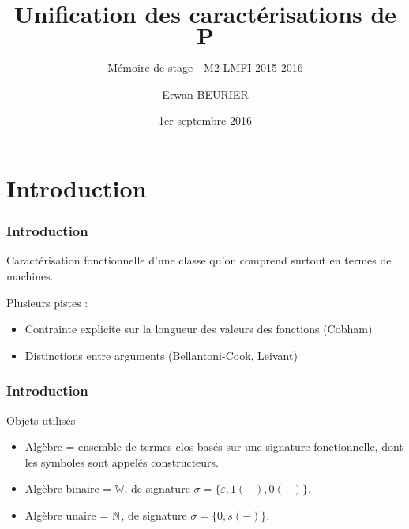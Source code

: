 \documentclass[10pt]{beamer}
\author{Erwan BEURIER}
\title{Unification des caractérisations de $\textbf{P}$}
\subtitle{Mémoire de stage - M2 LMFI 2015-2016}
\date{1er septembre 2016}
\newcommand{\bbW}{\mathbb{W}}
\begin{document}
    \begin{frame}
		\titlepage
    \end{frame}

	\section{Introduction}

	\begin{frame}
	\frametitle{Introduction}
		\begin{block}
			
			Caractérisation fonctionnelle d'une classe qu'on comprend surtout en termes de machines.
			
			\pause 

			Plusieurs pistes : 
			\begin{itemize}
				\item 	Contrainte explicite sur la longueur des valeurs des fonctions (Cobham)
				\item 	Distinctions entre arguments (Bellantoni-Cook, Leivant)
			\end{itemize}
			
%			
%			
		\end{block}
	\end{frame}
	
	\begin{frame}
		\frametitle{Introduction}
		\begin{block}{Objets utilisés}
			\begin{itemize}
				\item 	Algèbre = ensemble de termes clos basés sur une signature fonctionnelle, dont les symboles sont appelés constructeurs.
				\pause
				\item 	Algèbre binaire = $\bbW$, de signature $\sigma = \{\varepsilon, 1(-), 0(-) \}$.
				\item 	Algèbre unaire = $\mathbb{N}$, de signature $\sigma = \{ 0, s(-) \}$.
			\end{itemize}
		\end{block}
	\end{frame}
	
\end{document}
